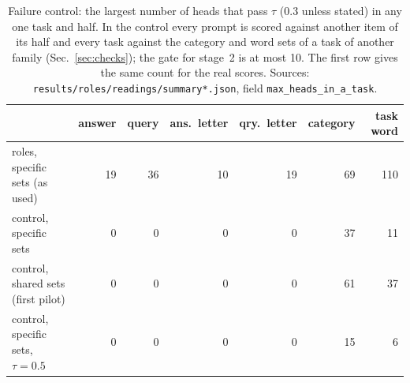 \begin{table}[tbp]
\centering\small
\begin{tabular}{@{}l rrrrrr@{}}
\toprule
 & answer & query & ans.\ letter & qry.\ letter & category & task word \\
\midrule
roles, specific sets (as used) & 19 & 36 & 10 & 19 & 69 & 110 \\
control, specific sets & 0 & 0 & 0 & 0 & 37 & 11 \\
control, shared sets (first pilot) & 0 & 0 & 0 & 0 & 61 & 37 \\
control, specific sets, $\tau=0.5$ & 0 & 0 & 0 & 0 & 15 & 6 \\
\bottomrule
\end{tabular}
\caption{Failure control: the largest number of heads that pass $\tau$ (0.3 unless stated) in any one task and half. In the control every prompt is scored against another item of its half and every task against the category and word sets of a task of another family (Sec.~\ref{sec:checks}); the gate for stage~2 is at most 10. The first row gives the same count for the real scores. Sources: \texttt{results/roles/readings/summary*.json}, field \texttt{max\_heads\_in\_a\_task}.}
\label{tab:control}
\end{table}
